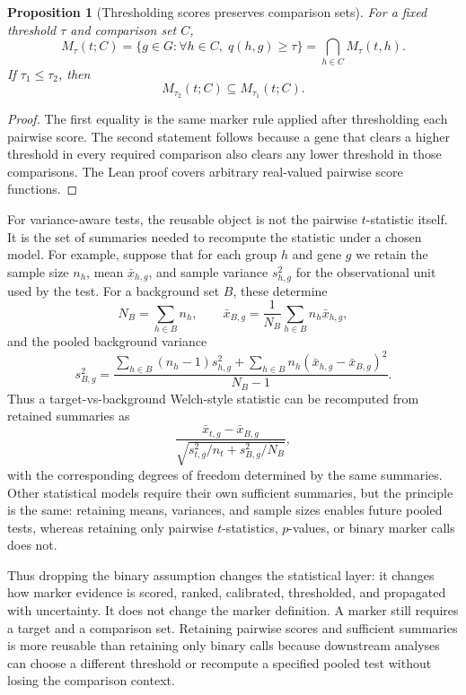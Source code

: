 \documentclass{article}
\newtheorem{proposition}{Proposition}
\begin{document}
\begin{proposition}[Thresholding scores preserves comparison sets]\label{prop:score-thresholding-preserves-scope}
For a fixed threshold $\tau$ and comparison set $C$,
\[
  M_{\tau}(t;C)
  =
  \{g\in G:\forall h\in C,\; q(h,g)\geq \tau\}
  =
  \bigcap_{h\in C} M_{\tau}(t,h).
\]
If $\tau_1\leq \tau_2$, then
\[
  M_{\tau_2}(t;C)\subseteq M_{\tau_1}(t;C).
\]
\end{proposition}

\begin{proof}
The first equality is the same marker rule applied after thresholding each pairwise score. The second statement follows because a gene that clears a higher threshold in every required comparison also clears any lower threshold in those comparisons. The Lean proof covers arbitrary real-valued pairwise score functions.
\end{proof}

For variance-aware tests, the reusable object is not the pairwise $t$-statistic itself. It is the set of summaries needed to recompute the statistic under a chosen model. For example, suppose that for each group $h$ and gene $g$ we retain the sample size $n_h$, mean $\bar{x}_{h,g}$, and sample variance $s^2_{h,g}$ for the observational unit used by the test. For a background set $B$, these determine
\[
  N_B=\sum_{h\in B}n_h,\qquad
  \bar{x}_{B,g}=\frac{1}{N_B}\sum_{h\in B} n_h\bar{x}_{h,g},
\]
and the pooled background variance
\[
  s^2_{B,g}
  =
  \frac{
    \sum_{h\in B}(n_h-1)s^2_{h,g}
    +
    \sum_{h\in B}n_h(\bar{x}_{h,g}-\bar{x}_{B,g})^2
  }{N_B-1}.
\]
Thus a target-vs-background Welch-style statistic can be recomputed from retained summaries as
\[
  \frac{\bar{x}_{t,g}-\bar{x}_{B,g}}
       {\sqrt{s^2_{t,g}/n_t+s^2_{B,g}/N_B}},
\]
with the corresponding degrees of freedom determined by the same summaries. Other statistical models require their own sufficient summaries, but the principle is the same: retaining means, variances, and sample sizes enables future pooled tests, whereas retaining only pairwise $t$-statistics, $p$-values, or binary marker calls does not.

Thus dropping the binary assumption changes the statistical layer: it changes how marker evidence is scored, ranked, calibrated, thresholded, and propagated with uncertainty. It does not change the marker definition. A marker still requires a target and a comparison set. Retaining pairwise scores and sufficient summaries is more reusable than retaining only binary calls because downstream analyses can choose a different threshold or recompute a specified pooled test without losing the comparison context.
\end{document}
